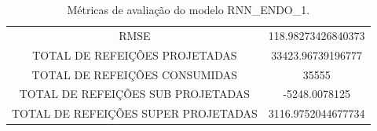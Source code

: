 \documentclass[	12pt, Times, openright, twoside, a4paper, english, brazil]{abntex2}
\begin{document}
                \begin{table}[!ht]
                   \centering
                   \caption{Métricas de avaliação do modelo RNN\_ENDO\_1.}
                \begin{tabular}{|c|c|}
                \rowcolor{gray!50} \hline
                \multicolumn{2}{c}{ METRICAS DO MODELO RNN\_ENDO\_1 : }\\ \hline
                RMSE & 118.98273426840373\\
                TOTAL DE REFEIÇÕES PROJETADAS & 33423.96739196777\\
                TOTAL DE REFEIÇÕES CONSUMIDAS & 35555\\
                TOTAL DE REFEIÇÕES SUB PROJETADAS & -5248.0078125\\
                TOTAL DE REFEIÇÕES SUPER PROJETADAS & 3116.9752044677734\\
                \hline
                \end{tabular}\end{table}

\end{document}
